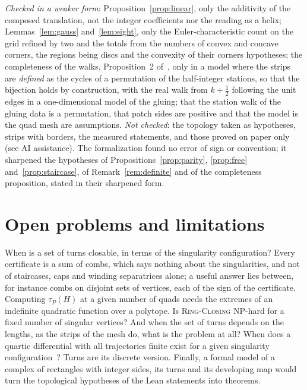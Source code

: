 \documentclass[11pt,a4paper]{article}
\newcommand{\RC}{\textup{\textsc{Ring-Closing}}}
\begin{document}
\emph{Checked in a weaker form}: Proposition~\ref{prop:linear}, only the
additivity of the composed translation, not the integer coefficients nor the
reading as a helix; Lemmas~\ref{lem:gauss} and~\ref{lem:eight}, only the
Euler-characteristic count on the grid refined by two and the totals from the
numbers of convex and concave corners, the regions being discs and the
convexity of their corners hypotheses; the completeness of the walks,
Proposition~2 of~\cite{gardent2026loops}, only in a model where the strips
are \emph{defined} as the cycles of a permutation of the half-integer
stations, so that the bijection holds by construction, with the real walk
from $k + \frac12$ following the unit edges in a one-dimensional model of the
gluing; that the station walk of the gluing data is a permutation, that patch
sides are positive and that the model is the quad mesh are assumptions.
\emph{Not checked}: the topology taken as hypotheses, strips with borders, the
measured statements, and those proved on paper only (see AI assistance). The formalization found no error of sign or
convention; it sharpened the hypotheses of Propositions~\ref{prop:parity},
\ref{prop:free} and~\ref{prop:staircase}, of Remark~\ref{rem:definite} and of
the completeness proposition, stated in their sharpened form.

\section{Open problems and limitations}\label{sec:open}

When is a set of turns closable, in terms of the singularity configuration?
Every certificate is a sum of combs, which says nothing about the
singularities, and not of staircases, caps and winding separatrices alone; a
useful answer lies between, for instance combs on disjoint sets of vertices,
each of the sign of the certificate. Computing $\tau_P(H)$ at a given number of quads needs the extremes of an
indefinite quadratic function over a polytope. Is \RC{} NP-hard for a fixed number of singular vertices? And when
the set of turns depends on the lengths, as the strips of the mesh do, what is
the problem at all? When does a quartic differential with all trajectories finite exist for a
given singularity configuration~\cite{lei2020quartic}? Turns are its discrete
version. Finally, a formal model of a complex
of rectangles with integer sides, its turns and its developing map would turn
the topological hypotheses of the Lean statements into theorems.
\end{document}
